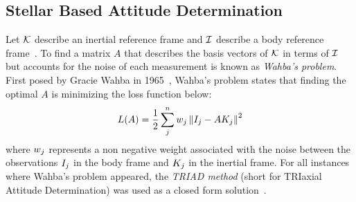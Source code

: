 \subsection{Stellar Based Attitude Determination}\label{subsec:stellarBasedAttitudeDetermination}
%

Let $\mathcal{K}$ describe an inertial reference frame and $\mathcal{I}$ describe a body reference
frame~\cite{wie:spaceVehicleDynamics}.
To find a matrix $A$ that describes the basis vectors of $\mathcal{K}$ in terms of $\mathcal{I}$ but accounts
for the noise of each measurement is known as \textit{Wahba's problem}.
First posed by Gracie Wahba in 1965~\cite{wahba:attitudeEstimationProblem},
Wahba's problem states that finding the optimal $A$ is minimizing the loss function below:
\begin{equation}
    L(A) = \frac{1}{2} \sum_j^n w_j \left\| I_j - AK_j \right\|^2
\end{equation}
where $w_j$ represents a non negative weight associated with the noise between the observations $I_j$
in the body frame and $K_j$ in the inertial frame.
For all instances where Wahba's problem appeared, the \textit{TRIAD method} (short for TRIaxial Attitude Determination)
was used as a closed form solution~\cite{markley:attitudeDeterminationTwoVectors}.

